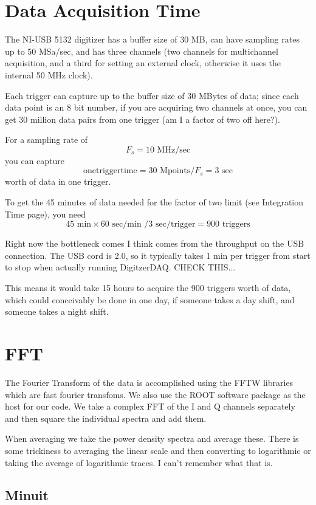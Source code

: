 \documentclass[11pt]{article}
\begin{document}
\section{Data Acquisition Time}
The NI-USB 5132 digitizer has a buffer size of 30 MB, can have sampling rates up to 50 MSa/sec, and has three channels (two channels for multichannel acquisition, and a third for setting an external clock, otherwise it uses the internal 50 MHz clock).

Each trigger can capture up to the buffer size of 30 MBytes of data; since each data point is an 8 bit number, if you are acquiring two channels at once, you can get 30 million data pairs from one trigger (am I a factor of two off here?).

For a sampling rate of $$F_s = 10\text{ MHz}/\text{sec}$$ you can capture $$\text{onetriggertime} = 30 \text{ Mpoints}/F_s = 3 \text{ sec}$$ worth of data in one trigger.

To get the 45 minutes of data needed for the factor of two limit (see Integration Time page), you need $$45\text{ min} \times 60\text{ sec/min }/ 3 \text{ sec/trigger} = 900\text{ triggers}$$

Right now the bottleneck comes I think comes from the throughput on the USB connection. The USB cord is 2.0, so it typically takes 1 min per trigger from start to stop when actually running DigitzerDAQ. CHECK THIS...

This means  it would take 15 hours to acquire the 900 triggers worth of data, which could conceivably be done in one day, if someone takes a day shift, and someone takes a night shift. 

\section{FFT}

The Fourier Transform of the data is accomplished using the FFTW libraries which are fast fourier transfoms. We also use the ROOT software package as the host for our code. We take a complex FFT of the I and Q channels separately and then square the individual spectra and add them.

When averaging we take the power density spectra and average these. There is some trickiness to averaging the linear scale and then converting to logarithmic or taking the average of logarithmic traces. I can't remember what that is.


\subsection{Minuit}
\end{document}
